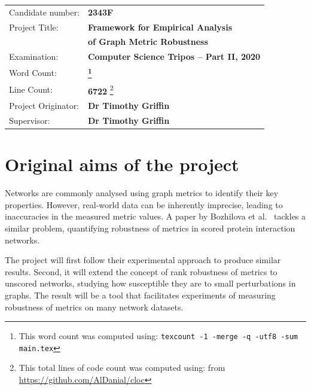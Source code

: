 \documentclass[12pt,a4paper,twoside,openany]{report}
\begin{document}
    {\large
        \begin{savenotes}
            \begin{tabular}{ll}
                Candidate number: & \textbf{2343F}                            \\
                Project Title: & \textbf{Framework for Empirical Analysis} \\ & \textbf{of Graph Metric Robustness}                    \\
                Examination: & \textbf{Computer Science Tripos -- Part II, 2020} \\
                Word Count: & \textbf{\footnote{This word count was computed using: \texttt{texcount -1 -merge -q -utf8 -sum main.tex}}}                                    \\
                Line Count: & \textbf{6722} \footnote{This total lines of code count was computed using:
                    \vspace*{-3.5mm}\hspace*{7mm} from \url{https://github.com/AlDanial/cloc} } \\
                Project Originator: & \textbf{Dr Timothy Griffin}                               \\
                Supervisor: & \textbf{Dr Timothy Griffin}                                        \\
            \end{tabular}
        \end{savenotes}
    }

    \section*{Original aims of the project}

    Networks are commonly analysed using graph metrics to identify their key properties.
    However, real-world data can be inherently imprecise, leading to inaccuracies in the measured metric values.
    A paper by Bozhilova et al.~\cite{Bozhilova2019} tackles a similar problem, quantifying robustness of metrics in scored protein interaction networks.

    The project will first follow their experimental approach to produce similar results.
    Second, it will extend the concept of rank robustness of metrics to unscored networks, studying how susceptible they are to small perturbations in graphs.
    The result will be a tool that facilitates experiments of measuring robustness of metrics on many network datasets.
\end{document}
